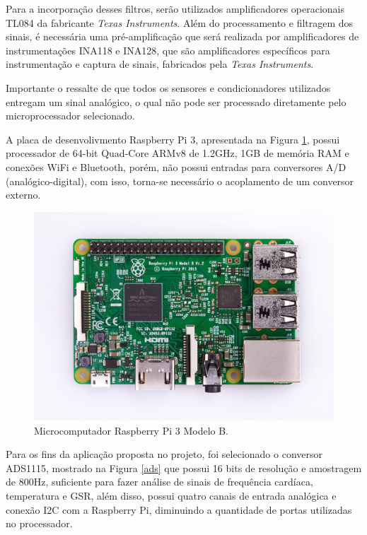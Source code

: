 Para a incorporação desses filtros, serão utilizados amplificadores operacionais 
TL084 da fabricante \textit{Texas Instruments}. Além do processamento e filtragem 
dos sinais, é necessária uma pré-amplificação que será realizada por amplificadores 
de instrumentações INA118 e INA128, que são amplificadores específicos 
para instrumentação e captura de sinais, fabricados pela \textit{Texas Instruments}.

Importante o ressalte de que todos os sensores e condicionadores utilizados
entregam um sinal analógico, o qual não pode ser processado diretamente
pelo microprocessador selecionado.

A placa de desenvolivmento Raspberry Pi 3, apresentada na Figura \ref{fig:rasp}, 
possui processador de 64-bit Quad-Core ARMv8 de 1.2GHz, 1GB de memória RAM e 
conexões WiFi e Bluetooth, porém, não possui 
entradas para 
conversores A/D (analógico-digital), com isso, torna-se necessário o acoplamento de um conversor externo.

\begin{figure}[H]
  \centering
    \includegraphics[width=\textwidth]{figuras/rasp.eps}
  \caption{Microcomputador Raspberry Pi 3 Modelo B.}
  \label{fig:rasp}
\end{figure}

Para os fins da aplicação proposta no projeto, foi selecionado o conversor 
ADS1115, mostrado na Figura \ref{ads} que possui 16 bits de resolução e amostragem 
de 800Hz, suficiente para fazer análise de sinais de frequência cardíaca, 
temperatura e GSR, além disso, possui quatro canais de entrada analógica e 
conexão I2C com a Raspberry Pi, diminuindo a quantidade de portas utilizadas no processador. 

